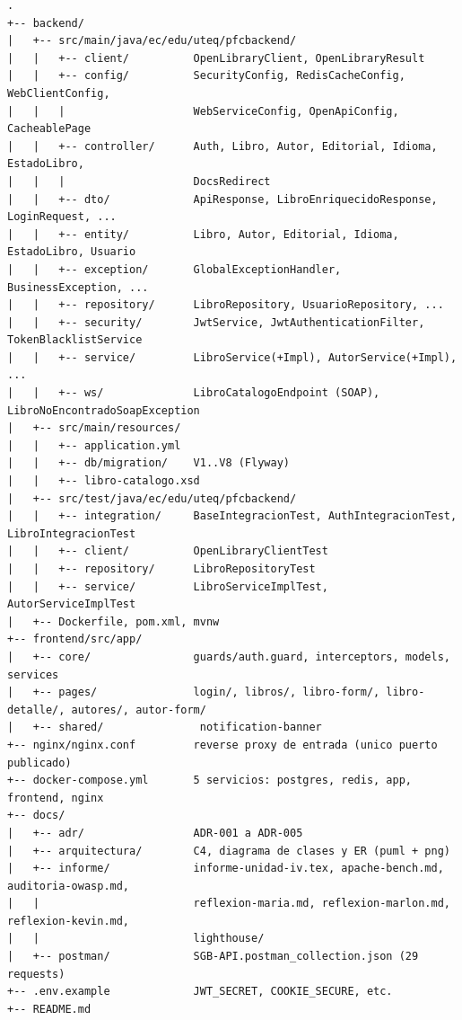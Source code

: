 \documentclass[12pt,a4paper]{article}
\begin{document}
\begin{lstlisting}[basicstyle=\ttfamily\scriptsize, columns=fullflexible, caption={Estructura del repositorio.}]
.
+-- backend/
|   +-- src/main/java/ec/edu/uteq/pfcbackend/
|   |   +-- client/          OpenLibraryClient, OpenLibraryResult
|   |   +-- config/          SecurityConfig, RedisCacheConfig, WebClientConfig,
|   |   |                    WebServiceConfig, OpenApiConfig, CacheablePage
|   |   +-- controller/      Auth, Libro, Autor, Editorial, Idioma, EstadoLibro,
|   |   |                    DocsRedirect
|   |   +-- dto/             ApiResponse, LibroEnriquecidoResponse, LoginRequest, ...
|   |   +-- entity/          Libro, Autor, Editorial, Idioma, EstadoLibro, Usuario
|   |   +-- exception/       GlobalExceptionHandler, BusinessException, ...
|   |   +-- repository/      LibroRepository, UsuarioRepository, ...
|   |   +-- security/        JwtService, JwtAuthenticationFilter, TokenBlacklistService
|   |   +-- service/         LibroService(+Impl), AutorService(+Impl), ...
|   |   +-- ws/              LibroCatalogoEndpoint (SOAP), LibroNoEncontradoSoapException
|   +-- src/main/resources/
|   |   +-- application.yml
|   |   +-- db/migration/    V1..V8 (Flyway)
|   |   +-- libro-catalogo.xsd
|   +-- src/test/java/ec/edu/uteq/pfcbackend/
|   |   +-- integration/     BaseIntegracionTest, AuthIntegracionTest, LibroIntegracionTest
|   |   +-- client/          OpenLibraryClientTest
|   |   +-- repository/      LibroRepositoryTest
|   |   +-- service/         LibroServiceImplTest, AutorServiceImplTest
|   +-- Dockerfile, pom.xml, mvnw
+-- frontend/src/app/
|   +-- core/                guards/auth.guard, interceptors, models, services
|   +-- pages/               login/, libros/, libro-form/, libro-detalle/, autores/, autor-form/
|   +-- shared/               notification-banner
+-- nginx/nginx.conf         reverse proxy de entrada (unico puerto publicado)
+-- docker-compose.yml       5 servicios: postgres, redis, app, frontend, nginx
+-- docs/
|   +-- adr/                 ADR-001 a ADR-005
|   +-- arquitectura/        C4, diagrama de clases y ER (puml + png)
|   +-- informe/             informe-unidad-iv.tex, apache-bench.md, auditoria-owasp.md,
|   |                        reflexion-maria.md, reflexion-marlon.md, reflexion-kevin.md,
|   |                        lighthouse/
|   +-- postman/             SGB-API.postman_collection.json (29 requests)
+-- .env.example             JWT_SECRET, COOKIE_SECURE, etc.
+-- README.md
\end{lstlisting}
\end{document}
